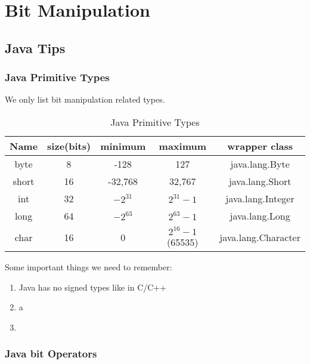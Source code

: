 \chapter{Bit Manipulation}




\section{Java Tips  }
\subsection{Java Primitive  Types  } 


We only list bit manipulation related types.
\begin{table}[ht]
\caption{Java Primitive  Types} %
\centering %
\begin{tabular}{ | c | c | c | c | c |  }
 \hline
          Name   &  size(bits) & minimum    & maximum &  wrapper class   \\
 \hline
          byte   &  8          & -128       &  127    &  java.lang.Byte \\
 \hline
          short   &  16        &  -32,768   &   32,767     &  java.lang.Short \\
 \hline
          int   &   32          & ${-2^{31}}$       &   ${2^{31}-1}$    &  java.lang.Integer \\
 \hline
          long   &  64         & ${-2^{63}}$       &  ${2^{63}-1}$   &  java.lang.Long \\
 \hline
           char   &  16         & 0         &  ${2^{16}-1}$ (65535) &  java.lang.Character \\
 \hline

\end{tabular}
\label{tab:java_types} %

\end{table}

Some important things we need to remember:
\begin{enumerate}
    \item   Java has no signed types like in C/C++

    \item   a

    \item

\end{enumerate}

\subsection{Java bit Operators  } 

